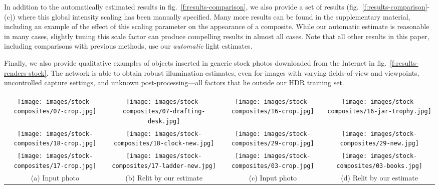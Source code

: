 In addition to the automatically estimated results in fig.~\ref{f:results-comparison}, we also provide a set of results (fig.~\ref{f:results-comparison}-(c)) where this global intensity scaling has been manually specified. Many more results can be found in the supplementary material, including an example of the effect of this scaling parameter on the appearance of a composite. While our automatic estimate is reasonable in many cases, slightly tuning this scale factor can produce compelling results in almost all cases. Note that all other results in this paper, including comparisons with previous methods, use our \emph{automatic} light estimates.

Finally, we also provide qualitative examples of objects inserted in generic stock photos downloaded from the Internet in fig.~\ref{f:results-renders-stock}. The network is able to obtain robust illumination estimates, even for images with varying fields-of-view and viewpoints, uncontrolled capture settings, and unknown post-processing---all factors that lie outside our HDR training set.


\begin{figure*}[!t]
\centering
\footnotesize
\setlength{\tabcolsep}{1pt}
\begin{tabular}{cccc}
%
\texttt{[image: images/stock-composites/07-crop.jpg]} & 
\texttt{[image: images/stock-composites/07-drafting-desk.jpg]} & 
\hspace{.4em}
\texttt{[image: images/stock-composites/16-crop.jpg]} & 
\texttt{[image: images/stock-composites/16-jar-trophy.jpg]}\vspace{.4em} \\
%
\texttt{[image: images/stock-composites/18-crop.jpg]} & 
\texttt{[image: images/stock-composites/18-clock-new.jpg]} & 
\hspace{.4em}
\texttt{[image: images/stock-composites/29-crop.jpg]} & 
\texttt{[image: images/stock-composites/29-new.jpg]}\vspace{.4em} \\
%
\texttt{[image: images/stock-composites/17-crop.jpg]} & 
\texttt{[image: images/stock-composites/17-ladder-new.jpg]} & 
\hspace{.4em}
\texttt{[image: images/stock-composites/03-crop.jpg]} & 
\texttt{[image: images/stock-composites/03-books.jpg]}\vspace{.4em}\\
%
(a) Input photo & 
(b) Relit by our estimate & 
\hspace{.5em}
(c) Input photo & 
(d) Relit by our estimate \\
\end{tabular}
\caption{Object relighting on a variety of generic stock photos downloaded from the Internet. In all cases, light estimation is performed completely automatically by our HDR network, the output of which is directly used by the rendering engine to relight the virtual objects.}
\label{f:results-renders-stock}
\end{figure*}

